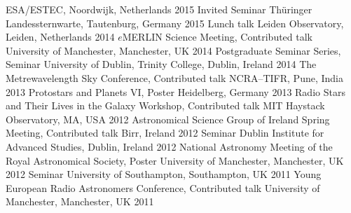 \begin{cvpress}
    {ESA/ESTEC, Noordwijk, Netherlands}
    {2015}
  \cvpres
    {Invited Seminar}
    {Th{\"u}ringer Landessternwarte, Tautenburg, Germany}
    {2015}
  \cvpres
    {Lunch talk}
    {Leiden Observatory, Leiden, Netherlands}
    {2014}
  \cvpres
    {$e$MERLIN Science Meeting, Contributed talk}
    {University of Manchester, Manchester, UK}
    {2014}
  \cvpres
    {Postgraduate Seminar Series, Seminar}
    {University of Dublin, Trinity College, Dublin, Ireland}
    {2014}
   \cvpres
   	{The Metrewavelength Sky Conference, Contributed talk}
    {NCRA--TIFR, Pune, India}
    {2013}
   \cvpres
   	{Protostars and Planets VI, Poster}
    {Heidelberg, Germany}
    {2013}
   \cvpres
   	{Radio Stars and Their Lives in the Galaxy Workshop, Contributed talk}
    {MIT Haystack Observatory, MA, USA}
    {2012}
   \cvpres
   	{Astronomical Science Group of Ireland Spring Meeting, Contributed talk}
    {Birr, Ireland}
    {2012}
   \cvpres
   	{Seminar}
    {Dublin Institute for Advanced Studies, Dublin, Ireland}
    {2012}
   \cvpres
   	{National Astronomy Meeting of the Royal Astronomical Society, Poster}
    {University of Manchester, Manchester, UK}
    {2012}
   \cvpres
   	{Seminar}
    {University of Southampton, Southampton, UK}
    {2011}
   \cvpres
   	{Young European Radio Astronomers Conference, Contributed talk}
    {University of Manchester, Manchester, UK}
    {2011}
\end{cvpress}

